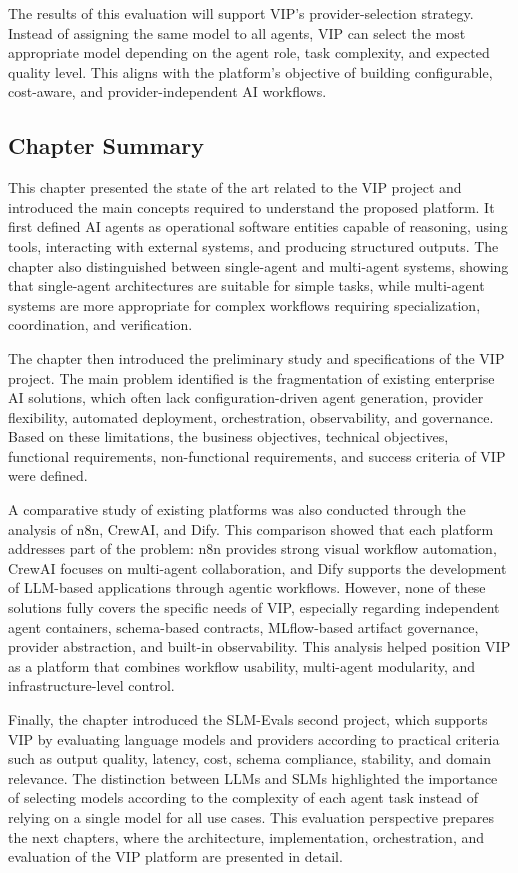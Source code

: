 The results of this evaluation will support VIP's provider-selection strategy. Instead of assigning the same model to all agents, VIP can select the most appropriate model depending on the agent role, task complexity, and expected quality level. This aligns with the platform's objective of building configurable, cost-aware, and provider-independent AI workflows.


\subsection{Chapter Summary}

This chapter presented the state of the art related to the VIP project and introduced the main concepts required to understand the proposed platform. It first defined AI agents as operational software entities capable of reasoning, using tools, interacting with external systems, and producing structured outputs. The chapter also distinguished between single-agent and multi-agent systems, showing that single-agent architectures are suitable for simple tasks, while multi-agent systems are more appropriate for complex workflows requiring specialization, coordination, and verification.

The chapter then introduced the preliminary study and specifications of the VIP project. The main problem identified is the fragmentation of existing enterprise AI solutions, which often lack configuration-driven agent generation, provider flexibility, automated deployment, orchestration, observability, and governance. Based on these limitations, the business objectives, technical objectives, functional requirements, non-functional requirements, and success criteria of VIP were defined.

A comparative study of existing platforms was also conducted through the analysis of n8n, CrewAI, and Dify. This comparison showed that each platform addresses part of the problem: n8n provides strong visual workflow automation, CrewAI focuses on multi-agent collaboration, and Dify supports the development of LLM-based applications through agentic workflows. However, none of these solutions fully covers the specific needs of VIP, especially regarding independent agent containers, schema-based contracts, MLflow-based artifact governance, provider abstraction, and built-in observability. This analysis helped position VIP as a platform that combines workflow usability, multi-agent modularity, and infrastructure-level control.

Finally, the chapter introduced the SLM-Evals second project, which supports VIP by evaluating language models and providers according to practical criteria such as output quality, latency, cost, schema compliance, stability, and domain relevance. The distinction between LLMs and SLMs highlighted the importance of selecting models according to the complexity of each agent task instead of relying on a single model for all use cases. This evaluation perspective prepares the next chapters, where the architecture, implementation, orchestration, and evaluation of the VIP platform are presented in detail.
